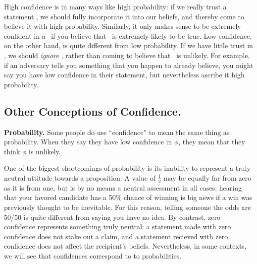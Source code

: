 High confidence is in many ways like high probability: if we really trust a statement \stmt, we should fully incorporate it into our beliefs, and thereby come to believe it with high probability. 
Similarly, it only makes sense to be extremely confident in a \stmt\ if you believe that \stmt\ is extremely likely to be true. 
Low confidence, on the other hand, is quite different from low probability. 
If we have little trust in \stmt, we should \emph{ignore} \stmt, rather than coming to believe that \stmt\ is unlikely.
For example, if an adversary tells you something that you happen to already believe,
you might say you have low confidence in their statement, but nevertheless ascribe it high probability. 


\subsection{Other Conceptions of Confidence.}

\textbf{Probability.}
Some people do use ``confidence'' to mean the same thing as probability. When they say they have low confidence in $\phi$, they mean that they think $\phi$ is unlikely. 

One of the biggest shortcomings of probability is its inability to represent a truly neutral attitude towards a proposition.  
A value of $\frac12$ may be equally far from zero as it is from one, but is by no means a neutral assessment in all cases: hearing that your favored candidate has a 50\% chance of winning is big news if a win was previously thought to be inevitable. 
For this reason, telling someone the odds are 50/50 is quite different from saying you have no idea. 
By contrast, zero confidence represents something truly neutral: 
	a statement made with zero confidence does not stake out a claim, and 
	a statement recieved with zero confidence does not affect the recipient's beliefs. 
Nevertheless, in some contexts, we will see that confidences correspond to to probabilities.

